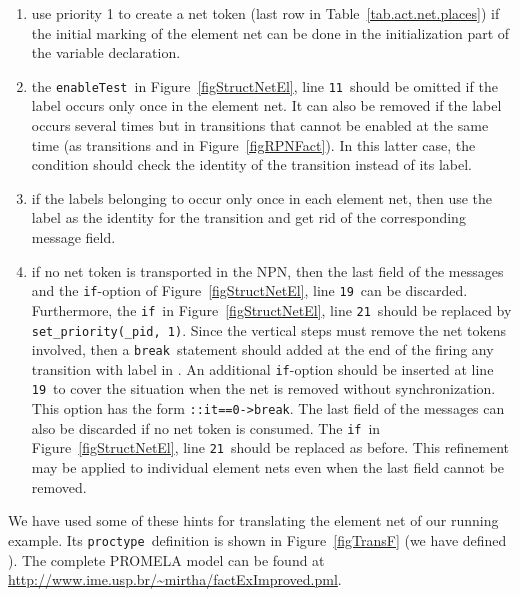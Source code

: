 \documentclass{llncs}
\begin{document}
\begin{enumerate}
\item use priority 1 to create a net token (last row in Table~\ref{tab.act.net.places}) if the initial marking of the element net  can be done in the initialization part of the variable declaration.
  \item the \small\verb"enableTest"\nfont\  in Figure~\ref{figStructNetEl}, line \small\verb"11"\nfont\  should be omitted if the label occurs only once in the element net. It can also be removed if the label occurs several times but in transitions that cannot be enabled at the same time (as transitions  and  in Figure~\ref{figRPNFact}). In this latter case, the condition should check the identity of the transition instead of its label.
  \item if the labels belonging to  occur only once in each element net, then use the label as the identity for the transition and get rid of the corresponding message field.
  \item if no net token is transported in the NPN, then the last field of the messages and the \small\verb"if"\nfont-option of Figure~\ref{figStructNetEl}, line \small\verb"19"\nfont\   can be discarded. Furthermore, the \small\verb"if"\nfont\  in Figure~\ref{figStructNetEl}, line \small\verb"21"\nfont\ should be replaced by \small\verb"set_priority(_pid, 1)"\nfont. Since the vertical steps must remove the net tokens involved, then a \small\verb"break"\nfont\   statement should added at the end of the firing any transition with label in . An  additional \small\verb"if"\nfont-option should be inserted at line \small\verb"19"\nfont\   to cover the situation when the net is removed without synchronization. This option has the form \small\verb"::it==0->break"\nfont.
      The last field of the messages can also be discarded if no net token is consumed. The \small\verb"if"\nfont\  in Figure~\ref{figStructNetEl}, line \small\verb"21"\nfont\ should be replaced as before. This refinement may be applied to individual element nets even when the last field cannot be removed.
\end{enumerate}


We have used some of these hints for translating the element net  of our running example. Its \small\verb"proctype"\nfont\ definition is shown in Figure~\ref{figTransF} (we have defined ). The complete PROMELA model can be found at \small\url{http://www.ime.usp.br/~mirtha/factExImproved.pml}\nfont.
\end{document}
